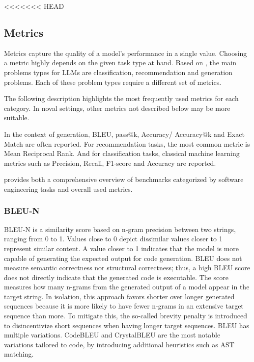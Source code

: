 \documentclass[11pt]{article}
\begin{document}
<<<<<<< HEAD
\subsection{Metrics}
Metrics capture the quality of a model's performance in a single value.
Choosing a metric highly depends on the given task type at hand.
Based on \cite{10.1145/3695988}, the main problems types for LLMs are classification, recommendation and generation problems.
Each of these problem types require a different set of metrics.

The following description highlights the most frequently used metrics for each category.
In noval settings, other metrics not described below may be more suitable. %

In the context of generation, BLEU, pass@k, Accuracy/ Accuracy@k and Exact Match are often reported.
For recommendation tasks, the most common metric is Mean Reciprocal Rank.
And for classification tasks, classical machine learning metrics such as Precision, Recall, F1-score and Accuracy are reported.

\cite{10.1145/3695988} provides both a comprehensive overview of benchmarks categorized by software engineering tasks and overall used metrics.

\subsubsection{BLEU-N}

BLEU-N \cite{DBLP:conf/acl/PapineniRWZ02} is a similarity score based on n-gram precision between two strings, ranging from 0 to 1.
Values close to 0 depict dissimilar values closer to 1 represent similar content.
A value closer to 1 indicates that the model is more capable of generating the expected output for code generation.
BLEU does not measure semantic correctness nor structural correctness; thus, a high BLEU score does not directly indicate that the generated code is executable.
The score measures how many n-grams from the generated output of a model appear in the target string.
In isolation, this approach favors shorter over longer generated sequences because it is more likely to have fewer n-grams in an extensive target sequence than more.
To mitigate this, the so-called brevity penalty is introduced to disincentivize short sequences when having longer target sequences.
BLEU has multiple variations.
CodeBLEU \cite{DBLP:journals/corr/abs-2009-10297} and CrystalBLEU \cite{DBLP:conf/kbse/EghbaliP22} are the most notable variations tailored to code, by introducing additional heuristics such as AST matching.
\end{document}
